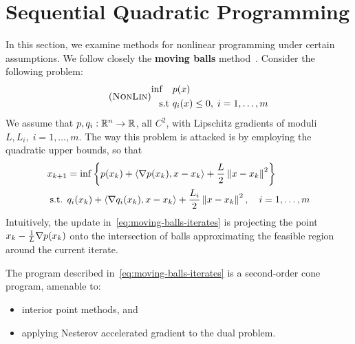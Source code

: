 \section{Sequential Quadratic Programming}

In this section, we examine methods for nonlinear programming under certain
assumptions. We follow closely the \textbf{moving balls}
method~\cite{AusShefTeb10}. Consider the following problem:
\begin{align}
	\tag{\textsc{NonLin}}
	\begin{aligned}
		\inf \quad & p(x) \\
		\mbox{s.t } & q_i(x) \leq 0, \; i = 1, \dots, m
	\end{aligned}
	\label{eq:nonlinear-prog}
\end{align}
We assume that $p, q_i : \mathbb{R}^n \to \mathbb{R}$, all $C^2$, with Lipschitz gradients
of moduli $L, L_i, \; i = 1, \dots, m$. The way this problem is attacked is
by employing the quadratic upper bounds, so that
\begin{align}
	\begin{aligned}
	x_{k+1} &= \inf \left\{  p(x_k) + \left\langle \nabla p(x_k), x - x_k \right\rangle +
			\frac{L}{2} \left \| x - x_k \right \|^2  \right\} \\
	\mbox{s.t. } & q_i(x_k) + \left\langle \nabla q_i(x_k), x - x_k \right\rangle +
		\frac{L_i}{2} \left \| x - x_k \right \|^2, \quad i = 1, \dots, m
	\end{aligned}
	\label{eq:moving-balls-iterates}
\end{align}
Intuitively, the update in~\cref{eq:moving-balls-iterates} is projecting the
point $x_k - \frac{1}{L} \nabla p(x_k)$ onto the intersection of balls
approximating the feasible region around the current iterate.

The program described in~\cref{eq:moving-balls-iterates} is a second-order cone
program, amenable to:
\begin{itemize}
	\item interior point methods, and
	\item applying Nesterov accelerated gradient to the dual problem.
\end{itemize}

